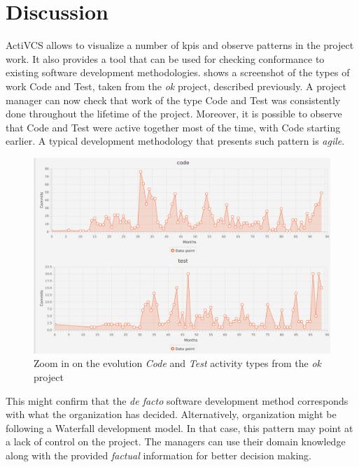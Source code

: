 \section{Discussion}
\label{sec:discussion}

ActiVCS allows to visualize a number of \glspl{kpi} and observe patterns in the project work. It also provides a tool that can be used for checking conformance to existing software development methodologies. 
 shows a screenshot of the types of work Code and Test, taken from the \textsl{ok} project, described previously. A project manager can now check that work of the type Code and Test was consistently done throughout the lifetime of the project. Moreover, it is possible to observe that Code and Test were active together most of the time, with Code starting earlier. A typical development methodology that presents such pattern is \emph{agile}. 
\begin{figure}[]
    \centering
    \includegraphics[width=\textwidth]{Project-mining-2-Mining-Type-of-Work/figures/ok-code-test}
    \caption{Zoom in on the evolution \textsl{Code} and \textsl{Test} activity types from the \textsl{ok} project}
    \label{fig:zoom}
\end{figure}


This might confirm that the \textsl{de facto} software development method corresponds with what the organization has decided. Alternatively, organization might be following a Waterfall development model. In that case, this pattern may point at a lack of control on the project. The managers can use their domain knowledge along with the provided \emph{factual} information for better decision making.



